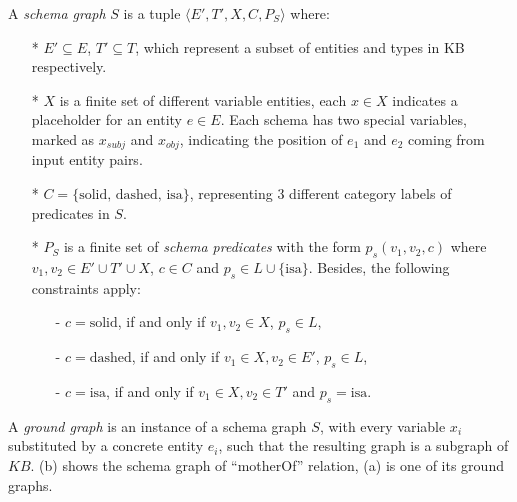 \begin{definition}
A \textit{schema graph} $S$ is a tuple $\langle E', T', X, C, P_S \rangle$ where:
\begin{itemize}
  \item[*] $E' \subseteq E$, $T' \subseteq T$, which represent
  a subset of entities and types in KB respectively.
  \item[*] $X$ is a finite set of different variable entities, each $x \in X$
  indicates a placeholder for an entity $e \in E$. Each schema has
  two special variables, marked as $x_{subj}$ and $x_{obj}$,
  indicating the position of $e_1$ and $e_2$ coming from input entity pairs.
  \item[*] $C=\{\text{solid, dashed, isa}\}$, representing 3 different
  category labels of predicates in $S$.
  \item[*] $P_S$ is a finite set of \textit{schema predicates} with the
  form $p_s(v_1, v_2, c)$ where $v_1, v_2 \in E' \cup T' \cup X$, $c \in C$
  and $p_s \in L \cup \{\text{isa}\}$. Besides, the following constraints apply:
  \begin{itemize}
    \item[-] $c = \text{solid}$, if and only if $v_1, v_2 \in X$, $p_s \in L$,
    \item[-] $c = \text{dashed}$, if and only if $v_1 \in X, v_2 \in E'$, $p_s \in L$,
    \item[-] $c = \text{isa}$, if and only if $v_1 \in X, v_2 \in T'$ and $p_s = \text{isa}$.
  \end{itemize}

\end{itemize}
\end{definition}

A \textit{ground graph} is an instance of a schema graph $S$, with
every variable $x_i$ substituted by a concrete entity $e_i$,
such that the resulting graph is a subgraph of $KB$.
(b) shows the schema graph of ``motherOf'' relation,
(a) is one of its ground graphs.

